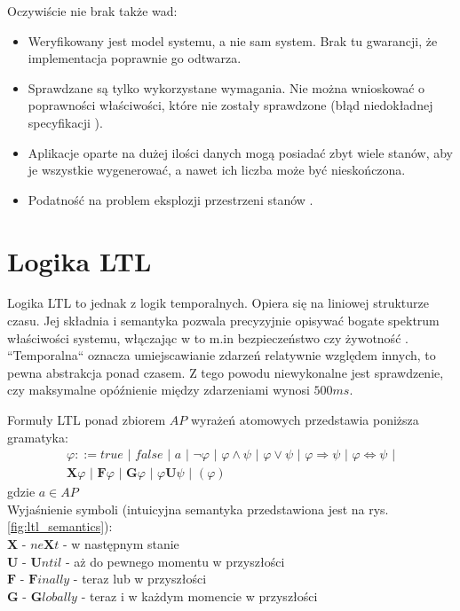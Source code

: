 \vspace{0.5cm}
\noindent
Oczywiście nie brak także wad:
\begin{itemize}
\item Weryfikowany jest model systemu, a nie sam system. Brak tu gwarancji, że implementacja poprawnie go odtwarza.
\item Sprawdzane są tylko wykorzystane wymagania. Nie można wnioskować o poprawności właściwości, które nie zostały sprawdzone (błąd niedokładnej specyfikacji \cite{Lam05}).
\item Aplikacje oparte na dużej ilości danych mogą posiadać zbyt wiele stanów, aby je wszystkie wygenerować, a nawet ich liczba może być nieskończona.
\item Podatność na problem eksplozji przestrzeni stanów \cite{Cla11}.
\end{itemize}


\section{Logika LTL}

Logika LTL to jednak z logik temporalnych. Opiera się na liniowej strukturze czasu.
Jej składnia i semantyka pozwala precyzyjnie opisywać bogate spektrum właściwości systemu, włączając w to m.in bezpieczeństwo czy żywotność \cite{Bel17}.
``Temporalna`` oznacza umiejscawianie zdarzeń relatywnie względem innych, to pewna abstrakcja ponad czasem.  Z tego powodu niewykonalne jest sprawdzenie, czy maksymalne opóźnienie między zdarzeniami wynosi $500ms$.

Formuły LTL ponad zbiorem $AP$ wyrażeń atomowych przedstawia poniższa gramatyka:
\begin{gather}
\varphi::= true \,\, | \,\, false \,\, | \,\, a \,\, | \,\, \neg\varphi \,\, | \,\, \varphi \land \psi \,\, | \,\, \varphi \lor \psi \,\, | \,\, \varphi \Rightarrow \psi \,\, | \,\, \varphi \Leftrightarrow \psi \,\, | \nonumber\\
\mathbf{X}\varphi \,\, | \,\, \mathbf{F}\varphi \,\, | \,\, \mathbf{G}\varphi \,\, | \,\, \varphi\mathbf{U}\psi \,\, | \,\, (\varphi)\nonumber
\end{gather}
gdzie $a \in AP$ \\
Wyjaśnienie symboli (intuicyjna semantyka przedstawiona jest na rys. \ref{fig:ltl_semantics}): \\
$\mathbf{X}$ - $ne\mathbf{X}t$ - w następnym stanie \\
$\mathbf{U}$ - $\mathbf{U}ntil$ - aż do pewnego momentu w przyszłości \\
$\mathbf{F}$ - $\mathbf{F}inally$ - teraz lub w przyszłości \\
$\mathbf{G}$ - $\mathbf{G}lobally$ - teraz i w każdym momencie w przyszłości
\vspace{0.5cm}

